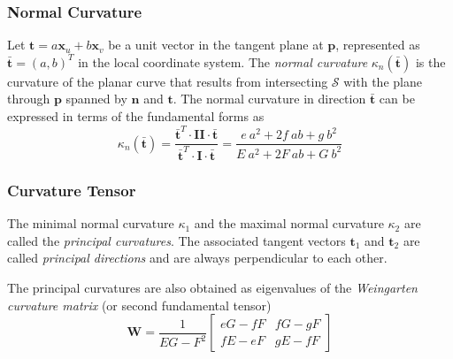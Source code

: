 \documentclass{InsightArticle}
\def \Surface {\mathcal{S}}
\theoremstyle{plain}
\begin{document}
\subsubsection{Normal Curvature}
Let $\mathbf{t}=a\mathbf{x}_u +b\mathbf{x}_v$ be a unit vector in the tangent plane at $\mathbf{p}$, represented as $\bar{\mathbf{t}}=(a,b)^T$ in the local coordinate system. The \emph{normal curvature} $\kappa_n(\bar{\mathbf{t}})$ is the curvature of the planar curve that results from intersecting $\Surface$ with the plane through $\mathbf{p}$ spanned by $\mathbf{n}$ and $\mathbf{t}$. The normal curvature in direction $\bar{\mathbf{t}}$ can be expressed in terms of the fundamental forms as
\begin{equation}
  \kappa_n(\bar{\mathbf{t}}) = \frac{\bar{\mathbf{t}}^T\cdot\mathbf{II}\cdot \bar{\mathbf{t}}}{\bar{\mathbf{t}}^T\cdot\mathbf{I}\cdot\bar{\mathbf{t}}} =
    \frac{e\ a^2+2f\ ab+ g\ b^2}{E\ a^2+ 2F\ ab+G\ b^2}
\end{equation}

\subsubsection{Curvature Tensor}
The minimal normal curvature $\kappa_1$ and the maximal normal curvature $\kappa_2$ are called the \emph{principal curvatures}. The associated tangent vectors $\mathbf{t}_1$ and $\mathbf{t}_2$ are called \emph{principal directions} and are always perpendicular to each other.

The principal curvatures are also obtained as eigenvalues of the \emph{Weingarten curvature matrix} (or second fundamental tensor)
\begin{equation}
  \mathbf{W} = \frac{1}{EG-F^2}
\left[
  \begin{array}{cc}
    eG-fF & fG-gF\\
    fE-eF & gE-fF
  \end{array}
\right]
\end{equation}
\end{document}
